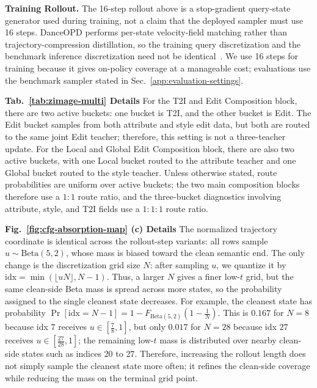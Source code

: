 \noindent\textbf{Training Rollout.}
The 16-step rollout above is a stop-gradient query-state generator used during training, not a claim that the deployed sampler must use 16 steps. DanceOPD performs per-state velocity-field matching rather than trajectory-compression distillation, so the training query discretization and the benchmark inference discretization need not be identical~\cite{lu2022dpm,karras2022elucidating}. We use 16 steps for training because it gives on-policy coverage at a manageable cost; evaluations use the benchmark sampler stated in Sec.~\ref{app:evaluation-settings}.

\noindent\textbf{Tab.~\ref{tab:zimage-multi} Details}
For the T2I and Edit Composition block, there are two active buckets: one bucket is T2I, and the other bucket is Edit. The Edit bucket samples from both attribute and style edit data, but both are routed to the same joint Edit teacher; therefore, this setting is not a three-teacher update. For the Local and Global Edit Composition block, there are also two active buckets, with one Local bucket routed to the attribute teacher and one Global bucket routed to the style teacher. Unless otherwise stated, route probabilities are uniform over active buckets; the two main composition blocks therefore use a $1{:}1$ route ratio, and the three-bucket diagnostics involving attribute, style, and T2I fields use a $1{:}1{:}1$ route ratio.

\noindent\textbf{Fig.~\ref{fig:cfg-absorption-map} (c) Details}
The normalized trajectory coordinate is identical across the rollout-step variants: all rows sample $u\sim\mathrm{Beta}(5,2)$, whose mass is biased toward the clean semantic end. The only change is the discretization grid size $N$: after sampling $u$, we quantize it by $\mathrm{idx}=\min(\lfloor uN\rfloor,N-1)$. Thus, a larger $N$ gives a finer low-$t$ grid, but the same clean-side Beta mass is spread across more states, so the probability assigned to the single cleanest state decreases. For example, the cleanest state has probability $\Pr[\mathrm{idx}=N-1]=1-F_{\mathrm{Beta}(5,2)}(1-\frac{1}{N})$. This is $0.167$ for $N{=}8$ because idx $7$ receives $u\in[\frac{7}{8},1]$, but only $0.017$ for $N{=}28$ because idx $27$ receives $u\in[\frac{27}{28},1]$; the remaining low-$t$ mass is distributed over nearby clean-side states such as indices $20$ to $27$. Therefore, increasing the rollout length does not simply sample the cleanest state more often; it refines the clean-side coverage while reducing the mass on the terminal grid point.

